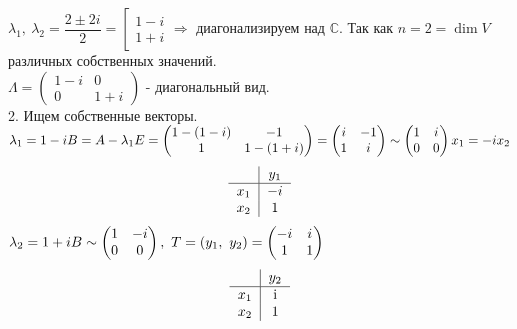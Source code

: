 \documentclass[12pt, letterpaper, twoside]{article}
\begin{document}
        $\lambda_1,\ \lambda_2 = \dfrac{2 \pm 2i}{2} = \left[ \begin{gathered}
            1 - i\\
            1 + i
        \end{gathered}\right.\Rightarrow $ диагонализируем над $\mathbb{C}$. Так как $n = 2 = \dim V$ различных собственных значений.\\
        $\Lambda = \begin{pmatrix}
            1 - i & 0\\
            0 & 1 + i
        \end{pmatrix}$ - диагональный вид.\\
        2. Ищем собственные векторы.\\
        $\lambda_1 = 1 - i\\
        B = A - \lambda_1 E = \begin{pmatrix}
            1 - (1 - i) & -1\\
            1 & 1 - (1 + i)
        \end{pmatrix} = \begin{pmatrix}
            i & -1\\
            1 & i
        \end{pmatrix} \sim \begin{pmatrix}
            1 & i\\
            0 & 0
        \end{pmatrix}\\
        x_1 = -ix_2$
        \[\begin{tabular}{c | c}
            & $y_1$\\
            \hline
            $x_1$ & $-i$\\
            $x_2$ & $1$
        \end{tabular}\]
        $\lambda_2 = 1 + i\\
        B \sim \begin{pmatrix}
            1 & -i\\
            0 & 0
        \end{pmatrix},\ T = (y_1,\ y_2) = \begin{pmatrix}
            -i & i\\
            1 & 1
        \end{pmatrix}$
        \[\begin{tabular}{c | c}
            & $y_2$\\
            \hline
            $x_1$ & i\\
            $x_2$ & 1 
        \end{tabular}\]
\end{document}

